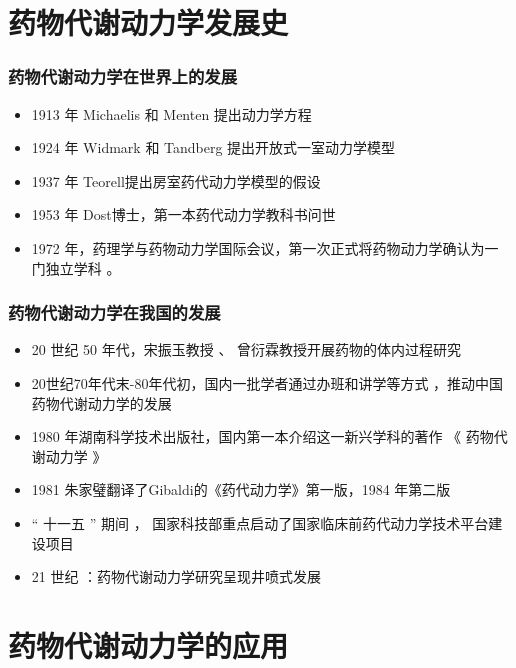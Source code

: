 \documentclass[dvipsnames, svgnames, x11names]{beamer}
\begin{document}


\section{药物代谢动力学发展史}


\begin{frame}
	\frametitle{药物代谢动力学在世界上的发展}
	\begin{itemize}
	  \item 1913 年 Michaelis 和 Menten 提出动力学方程
	  \item 1924 年 Widmark 和 Tandberg 提出开放式一室动力学模型
	  \item 1937 年 Teorell提出房室药代动力学模型的假设
	  \item 1953 年 Dost博士，第一本药代动力学教科书问世
	  \item 1972 年，药理学与药物动力学国际会议，第一次正式将药物动力学确认为一门独立学科 。
	\end{itemize}
\end{frame}



\begin{frame}
	\frametitle{药物代谢动力学在我国的发展}
	\begin{itemize}
	  \item 20 世纪 50 年代，宋振玉教授 、 曾衍霖教授开展药物的体内过程研究
	  \item 20世纪70年代末-80年代初，国内一批学者通过办班和讲学等方式 ，推动中国药物代谢动力学的发展
	  \item 1980 年湖南科学技术出版社，国内第一本介绍这一新兴学科的著作 《 药物代谢动力学 》
	  \item 1981 朱家璧翻译了Gibaldi的《药代动力学》第一版，1984 年第二版
	  \item “ 十一五 ” 期间 ， 国家科技部重点启动了国家临床前药代动力学技术平台建设项目
	  \item 21 世纪 ：药物代谢动力学研究呈现井喷式发展
	\end{itemize}
\end{frame}


\section{药物代谢动力学的应用}
	
\end{document}

